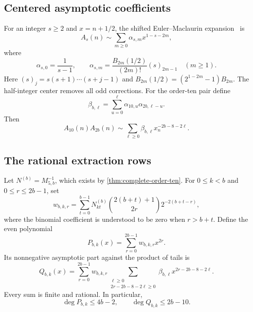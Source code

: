 \documentclass[11pt]{article}
\theoremstyle{definition}
\begin{document}
\subsection{Centered asymptotic coefficients}

For an integer $s\ge2$ and $x=n+1/2$, the shifted Euler--Maclaurin
expansion~\cite{DLMF} is
\begin{equation}
 A_s(n)\sim\sum_{m\ge0}\alpha_{s,m}x^{1-s-2m},
 \label{eq:centered-tail-asymptotic}
\end{equation}
where
\begin{equation}
 \alpha_{s,0}=\frac1{s-1},
 \qquad
 \alpha_{s,m}=\frac{B_{2m}(1/2)}{(2m)!}(s)_{2m-1}
 \quad(m\ge1).
 \label{eq:alpha}
\end{equation}
Here $(s)_j=s(s+1)\cdots(s+j-1)$ and
$B_{2m}(1/2)=(2^{1-2m}-1)B_{2m}$.  The half-integer center removes all
odd corrections.  For the order-ten pair define
\begin{equation}
 \beta_{b,\ell}=\sum_{u=0}^{\ell}
       \alpha_{10,u}\alpha_{2b,\ell-u}.
 \label{eq:beta}
\end{equation}
Then
\begin{equation}
 A_{10}(n)A_{2b}(n)
 \sim\sum_{\ell\ge0}\beta_{b,\ell}x_n^{-2b-8-2\ell}.
 \label{eq:product-asymptotic}
\end{equation}

\subsection{The rational extraction rows}

Let $N^{(b)}=M_{5,b}^{-1}$, which exists by
\cref{thm:complete-order-ten}.  For $0\le k<b$ and
$0\le r\le2b-1$, set
\begin{equation}
 w_{b,k,r}=\sum_{t=0}^{b-1}N^{(b)}_{kt}
      \binom{2(b+t)+1}{2r}
      2^{-2(b+t-r)},
 \label{eq:reconstruction-weight}
\end{equation}
where the binomial coefficient is understood to be zero when
$r>b+t$.  Define the even polynomial
\begin{equation}
 P_{b,k}(x)=\sum_{r=0}^{2b-1}w_{b,k,r}x^{2r}.
 \label{eq:Pbk}
\end{equation}
Its nonnegative asymptotic part against the product of tails is
\begin{equation}
 Q_{b,k}(x)=
 \sum_{r=0}^{2b-1}w_{b,k,r}
 \sum_{\substack{\ell\ge0\\2r-2b-8-2\ell\ge0}}
     \beta_{b,\ell}x^{2r-2b-8-2\ell}.
 \label{eq:Qbk}
\end{equation}
Every sum is finite and rational.  In particular,
\begin{equation}
 \deg P_{b,k}\le4b-2,
 \qquad
 \deg Q_{b,k}\le2b-10.
 \label{eq:PQ-degrees}
\end{equation}
\end{document}
